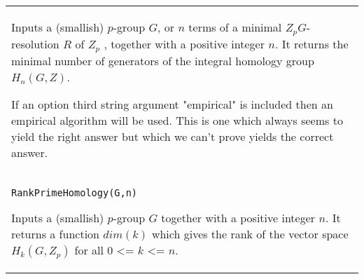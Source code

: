\documentclass[a4paper,11pt]{report}
\begin{document}
{\begin{center}
\begin{tabular}{|l|}
 Inputs a (smallish) $p$-group $G$, or $n$ terms of a minimal $Z_pG$-resolution $R$ of $Z_p$ , together with a positive integer $n$. It returns the minimal number of generators of the integral homology group $H_n(G,Z)$. 

 If an option third string argument "empirical" is included then an empirical
algorithm will be used. This is one which always seems to yield the right
answer but which we can't prove yields the correct answer. \\
 \index{RankPrimeHomology} \texttt{RankPrimeHomology(G,n)} 

 Inputs a (smallish) $p$-group $G$ together with a positive integer $n$. It returns a function $dim(k)$ which gives the rank of the vector space $H_k(G,Z_p)$ for all $0$ {\textless}= $k$ {\textless}= $n$. \\
\end{tabular}\\[2mm]
\end{center}

 }

 
\end{document}
